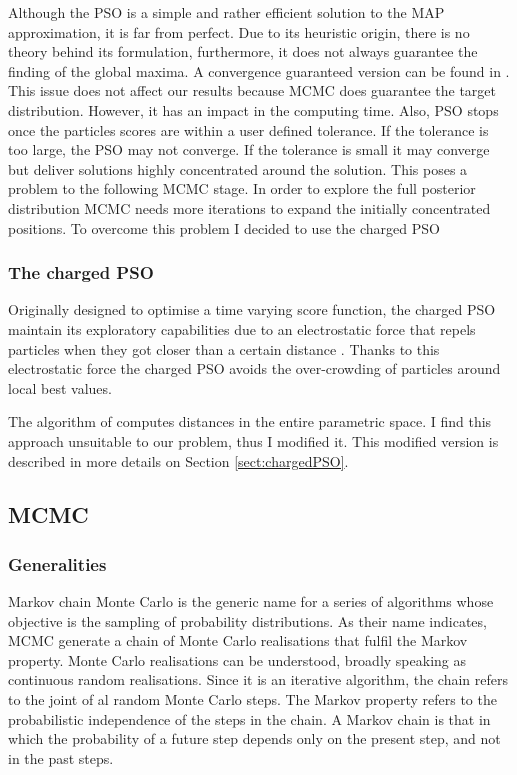 Although the PSO is a simple and rather efficient solution to the MAP approximation, it is far from perfect. Due to its heuristic origin, there is no theory behind its formulation, furthermore, it does not always guarantee the finding of the global maxima. A convergence guaranteed version can be found in \citet{Patel2013}. This issue does not affect our results because MCMC does guarantee the target distribution. However, it has an impact in the computing time. Also, PSO stops once the particles scores are within a user defined tolerance. If the tolerance is too large, the PSO may not converge. If the tolerance is small it may converge but deliver solutions highly concentrated around the solution. This poses a problem to the following MCMC stage. In order to explore the full posterior distribution MCMC needs more iterations to expand the initially concentrated positions. To overcome this problem I decided to use the charged PSO \citep{Blackwell2002}


\subsubsection{The charged PSO}
Originally designed to optimise a time varying score function, the charged PSO maintain its exploratory capabilities due to an electrostatic force that repels particles when they got closer than a certain distance \citep{Blackwell2002}. Thanks to this electrostatic force the charged PSO avoids the over-crowding of particles around local best values.

The algorithm of \citet{Blackwell2002} computes distances in the entire parametric space. I find this approach unsuitable to our problem, thus I modified it. This modified version is described in more details on Section \ref{sect:chargedPSO}. 

 
\subsection{MCMC}
\label{sect:MCMC}
\subsubsection{Generalities}
Markov chain Monte Carlo is the generic name for a series of algorithms whose objective is the sampling of probability distributions. As their name indicates, MCMC generate a chain of Monte Carlo realisations that fulfil the Markov property. Monte Carlo realisations can be understood, broadly speaking as continuous random realisations. Since it is an iterative algorithm, the chain refers to the joint of al random Monte Carlo steps. The Markov property refers to the probabilistic independence of the steps in the chain. A Markov chain is that in which the probability of a future step depends only on the present step, and not in the past steps.

